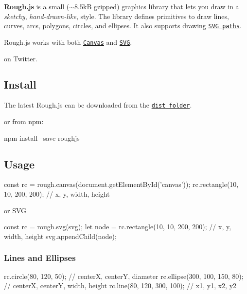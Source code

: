 {\bfseries Rough.\+js} is a small ($\sim$8.5kB gzipped) graphics library that lets you draw in a {\itshape sketchy}, {\itshape hand-\/drawn-\/like}, style. The library defines primitives to draw lines, curves, arcs, polygons, circles, and ellipses. It also supports drawing \href{https://developer.mozilla.org/en-US/docs/Web/SVG/Tutorial/Paths}{\tt S\+VG paths}.

Rough.\+js works with both \href{https://developer.mozilla.org/en-US/docs/Web/API/Canvas_API}{\tt Canvas} and \href{https://developer.mozilla.org/en-US/docs/Web/SVG}{\tt S\+VG}.



\href{https://twitter.com/RoughLib}{\tt } on Twitter.

\subsection*{Install}

The latest Rough.\+js can be downloaded from the \href{https://github.com/pshihn/rough/tree/master/dist}{\tt dist folder}.

or from npm\+:


\begin{DoxyCode}
npm install --save roughjs
\end{DoxyCode}


\subsection*{Usage}




\begin{DoxyCode}
const rc = rough.canvas(document.getElementById('canvas'));
rc.rectangle(10, 10, 200, 200); // x, y, width, height
\end{DoxyCode}


or S\+VG


\begin{DoxyCode}
const rc = rough.svg(svg);
let node = rc.rectangle(10, 10, 200, 200); // x, y, width, height
svg.appendChild(node);
\end{DoxyCode}


\subsubsection*{Lines and Ellipses}




\begin{DoxyCode}
rc.circle(80, 120, 50); // centerX, centerY, diameter
rc.ellipse(300, 100, 150, 80); // centerX, centerY, width, height
rc.line(80, 120, 300, 100); // x1, y1, x2, y2
\end{DoxyCode}


